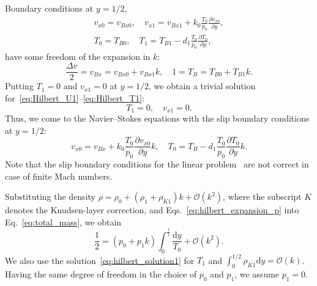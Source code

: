 \documentclass[aip,pof,preprint]{revtex4-1}
\newcommand{\dd}{\mathrm{d}}
\newcommand{\pder}[2][]{\frac{\partial#1}{\partial#2}}
\newcommand{\OO}[1]{\mathcal{O}(#1)}
\begin{document}
Boundary conditions at \(y=1/2\),
\begin{gather}
    v_{x0} = v_{Bx0}, \quad v_{x1} = v_{Bx1} + k_0 \frac{T_0}{p_0} \pder[v_{x0}]{y}, \label{eq:hilbert_bc_U}\\
    T_0 = T_{B0}, \quad T_1 = T_{B1} - d_1 \frac{T_0}{p_0} \pder[T_0]{y}, \label{eq:hilbert_bc_T}
\end{gather}
have some freedom of the expansion in \(k\):
\begin{equation}\label{eq:hilbert_boundary_expansion}
    \frac{\Delta{v}}2 = v_{Bx} = v_{Bx0} + v_{Bx1}k, \quad 1 = T_B = T_{B0} + T_{B1}k.
\end{equation}
Putting \(T_1 = 0\) and \(v_{x1} = 0\) at \(y=1/2\), we obtain a trivial solution
for~\eqref{eq:Hilbert_U1}--\eqref{eq:Hilbert_T1}:
\begin{equation}\label{eq:hilbert_solution1}
    T_1 = 0, \quad v_{x1} = 0.
\end{equation}
Thus, we come to the Navier--Stokes equations with the slip boundary conditions at \(y=1/2\):
\begin{equation}\label{eq:hilbert_slip_bc}
    v_{x0} = v_{Bx} + k_0 \frac{T_0}{p_0} \pder[v_{x0}]{y} k, \quad
    T_0 = T_B - d_1 \frac{T_0}{p_0} \pder[T_0]{y} k.
\end{equation}
Note that the slip boundary conditions for the linear problem~\cite{Sharipov2000}
are not correct in case of finite Mach numbers.

Substituting the density \(\rho = \rho_0 + (\rho_1+\rho_{K1})k + \OO{k^2}\),
where the subscript \(K\) denotes the Knudsen-layer correction,
and Eqs.~\eqref{eq:hilbert_expansion_p} into Eq.~\eqref{eq:total_mass}, we obtain
\begin{equation}\label{eq:hilbert_total_mass}
    \frac12 = (p_0 + p_1k)\int_{0}^\frac12\frac{\dd y}{T_0} + \OO{k^2}.
\end{equation}
We also use the solution~\eqref{eq:hilbert_solution1} for \(T_1\) and \(\int_{0}^{1/2}\rho_{K1}\dd{y} = \OO{k}\).
Having the same degree of freedom in the choice of \(p_0\) and \(p_1\), we assume \(p_1 = 0\).
\end{document}
